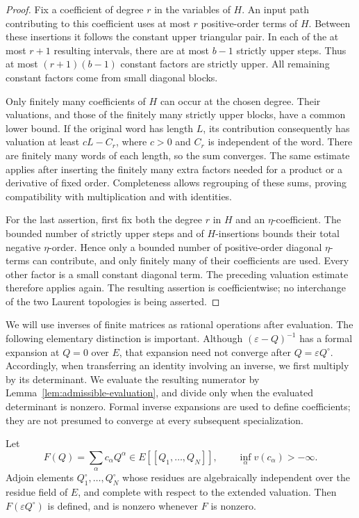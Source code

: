 \begin{proof}
Fix a coefficient of degree $r$ in the variables of $H$.  An input
path contributing to this coefficient uses at most $r$ positive-order
terms of $H$.  Between these insertions it follows the constant upper
triangular pair.  In each of the at most $r+1$ resulting intervals,
there are at most $b-1$ strictly upper steps.  Thus at most
$(r+1)(b-1)$ constant factors are strictly upper.  All remaining
constant factors come from small diagonal blocks.

Only finitely many coefficients of $H$ can occur at the chosen degree.
Their valuations, and those of the finitely many strictly upper
blocks, have a common lower bound.  If the original word has length
$L$, its contribution consequently has valuation at least
$cL-C_r$, where $c>0$ and $C_r$ is independent of the word.  There
are finitely many words of each length, so the sum converges.  The
same estimate applies after inserting the finitely many extra factors
needed for a product or a derivative of fixed order.  Completeness
allows regrouping of these sums, proving compatibility with
multiplication and with identities.

For the last assertion, first fix both the degree $r$ in $H$ and an
$\eta$-coefficient.  The bounded number of strictly upper steps and
of $H$-insertions bounds their total negative $\eta$-order.  Hence
only a bounded number of positive-order diagonal $\eta$-terms can
contribute, and only finitely many of their coefficients are used.
Every other factor is a small constant diagonal term.  The preceding
valuation estimate therefore applies again.  The resulting assertion
is coefficientwise; no interchange of the two Laurent topologies is
being asserted.
\end{proof}

We will use inverses of finite matrices as rational operations after
evaluation.  The following elementary distinction is important.
Although $(\varepsilon-Q)^{-1}$ has a formal expansion at $Q=0$ over
$E$, that expansion need not converge after $Q=\varepsilon Q^\circ$.
Accordingly, when transferring an identity involving an inverse, we
first multiply by its determinant.  We evaluate the resulting
numerator by Lemma~\ref{lem:admissible-evaluation}, and divide only
when the evaluated determinant is nonzero.  Formal inverse expansions
are used to define coefficients; they are not presumed to converge at
every subsequent specialization.

\begin{lemma}\label{lem:generic-detection}
Let
\[
 F(Q)=\sum_\alpha c_\alpha Q^\alpha\in E[[Q_1,\ldots,Q_N]],
 \qquad \inf_\alpha v(c_\alpha)>-\infty.
\]
Adjoin elements $Q_1^\circ,\ldots,Q_N^\circ$ whose residues are
algebraically independent over the residue field of $E$, and complete
with respect to the extended valuation.  Then
$F(\varepsilon Q^\circ)$ is defined, and is nonzero whenever $F$ is
nonzero.
\end{lemma}

